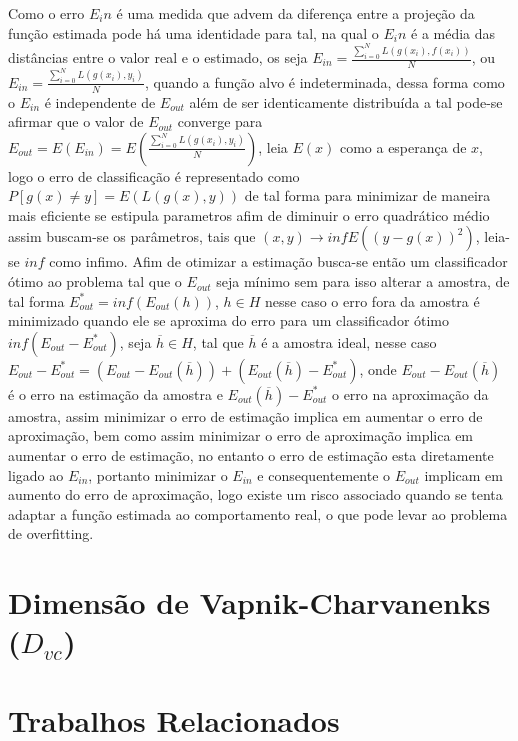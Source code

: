 \documentclass[pfc]{imetex}
\begin{document}
    Como o erro $E_in$ é uma medida que advem da diferença entre a projeção da função estimada pode há uma identidade para tal, na qual o $E_in$ é a média das distâncias entre o valor real e o estimado, os seja $E_{in} = \frac{\sum\limits_{i=0}^N L(g(x_i),f(x_i))}{N}$, ou $E_{in} = \frac{\sum\limits_{i=0}^N L(g(x_i),y_i)}{N}$, quando a função alvo é indeterminada, dessa forma como o $E_{in}$ é independente de $E_{out}$ além de ser identicamente distribuída a tal pode-se afirmar que o valor de $E_{out}$ converge para $E_{out} = E(E_{in}) = E(\frac{\sum\limits_{i=0}^N L(g(x_i),y_i)}{N})$, leia $E(x)$ como a esperança de $x$, logo o erro de classificação é representado como $P[g(x) \neq y] = E(L(g(x),y))$ de tal forma para minimizar de maneira mais eficiente se estipula parametros afim de diminuir o erro quadrático médio assim buscam-se os parâmetros, tais que $(x, y) \rightarrow inf E((y-g(x))^2)$, leia-se $inf$ como infimo.
    \newline
    Afim de otimizar a estimação busca-se então um classificador ótimo ao problema tal que o $E_{out}$ seja mínimo sem para isso alterar a amostra, de tal forma $E_{out}^{*} = inf( E_{out}(h))$, $h \in H$ nesse caso o erro fora da amostra é minimizado quando ele se aproxima do erro para um classificador ótimo $inf(E_{out}-E_{out}^{*})$, seja $\overline{h} \in H$, tal que $\overline{h}$ é a amostra ideal, nesse caso $E_{out}-E_{out}^{*} = (E_{out} - E_{out}(\overline{h})) + (E_{out}(\overline{h}) - E_{out}^{*})$, onde $E_{out} - E_{out}(\overline{h})$ é o erro na estimação da amostra e $E_{out}(\overline{h}) - E_{out}^{*}$ o erro na aproximação da amostra, assim minimizar o erro de estimação implica em aumentar o erro de aproximação, bem como assim minimizar o erro de aproximação implica em aumentar o erro de estimação, no entanto o erro de estimação esta diretamente ligado ao $E_{in}$, portanto minimizar o $E_{in}$ e consequentemente o $E_{out}$ implicam em aumento do erro de aproximação, logo existe um risco associado quando se tenta adaptar a função estimada ao comportamento real, o que pode levar ao problema de overfitting.
    \newline
    \section{Dimensão de Vapnik-Charvanenks ($D_{vc}$)}
    \newline
\label{fundamentaca}


\section{Trabalhos Relacionados}
\end{document}
